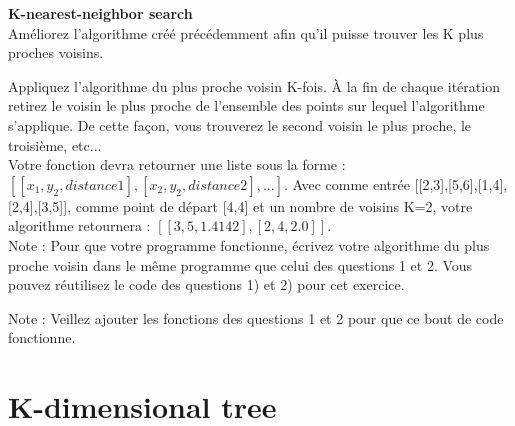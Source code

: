 \begin{Exercice}[15 minutes]\textbf{K-nearest-neighbor search}\\

Améliorez l'algorithme créé précédemment afin qu'il puisse trouver les K plus proches voisins.\\

\begin{conseil}
Appliquez l'algorithme du plus proche voisin K-fois. À la fin de chaque itération retirez le voisin le plus proche de l'ensemble des points sur lequel l'algorithme s'applique. De cette façon, vous trouverez le second voisin le plus proche, le troisième, etc...\\

Votre fonction devra retourner une liste sous la forme :~$[[x_1,y_2, distance1],[x_2,y_2,distance2],...]$. Avec comme entrée [[2,3],[5,6],[1,4],[2,4],[3,5]], comme point de départ [4,4] et un nombre de voisins K=2, votre algorithme retournera : $[[3, 5, 1.4142], [2, 4, 2.0]]$.\\

Note : Pour que votre programme fonctionne, écrivez votre algorithme du plus proche voisin dans le même programme que celui des questions 1 et 2. Vous pouvez réutilisez le code des questions 1) et 2) pour cet exercice.
\end{conseil}

\begin{solution}
    Note : Veillez ajouter les fonctions des questions 1 et 2 pour que ce bout de code fonctionne.
    
\end{solution}
\end{Exercice}
\newpage
\section{K-dimensional tree}

